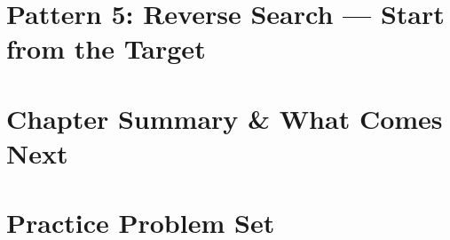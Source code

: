 \section{Pattern 5: Reverse Search --- Start from the Target}
\label{sec:ch2-p5}





\clearpage
\section{Chapter Summary \& What Comes Next}
\label{sec:ch2-summary}


\clearpage
\section{Practice Problem Set}
\label{sec:ch2-problems}

\clearpage

